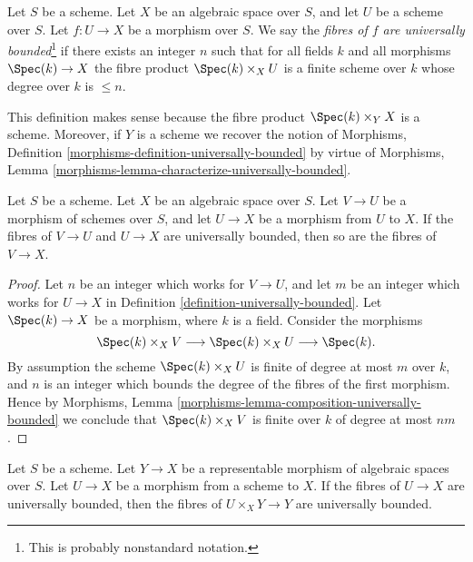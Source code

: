 \begin{definition}
\label{definition-universally-bounded}
Let $S$ be a scheme. Let $X$ be an algebraic space over $S$, and
let $U$ be a scheme over $S$. Let $f : U \to X$ be a morphism over $S$.
We say the {\it fibres of $f$ are universally bounded}\footnote{This is
probably nonstandard notation.}
if there exists an integer $n$ such that for all fields
$k$ and all morphisms $\Spec(k) \to X$ the fibre
product $\Spec(k) \times_X U$ is a finite scheme over $k$
whose degree over $k$ is $\leq n$.
\end{definition}

\noindent
This definition makes sense because the fibre product
$\Spec(k) \times_Y X$ is a scheme. Moreover, if $Y$ is a scheme
we recover the notion of
Morphisms, Definition \ref{morphisms-definition-universally-bounded}
by virtue of
Morphisms, Lemma \ref{morphisms-lemma-characterize-universally-bounded}.

\begin{lemma}
\label{lemma-composition-universally-bounded}
Let $S$ be a scheme. Let $X$ be an algebraic space over $S$.
Let $V \to U$ be a morphism of schemes over $S$, and let
$U \to X$ be a morphism from $U$ to $X$. If the fibres of
$V \to U$ and $U \to X$ are universally bounded, then so
are the fibres of $V \to X$.
\end{lemma}

\begin{proof}
Let $n$ be an integer which works for $V \to U$, and let $m$ be
an integer which works for $U \to X$ in
Definition \ref{definition-universally-bounded}.
Let $\Spec(k) \to X$ be a morphism, where $k$ is a field.
Consider the morphisms
$$
\Spec(k) \times_X V
\longrightarrow
\Spec(k) \times_X U
\longrightarrow
\Spec(k).
$$
By assumption the scheme $\Spec(k) \times_X U$
is finite of degree at most $m$ over $k$, and $n$ is an integer which
bounds the degree of the fibres of the first morphism. Hence by
Morphisms, Lemma \ref{morphisms-lemma-composition-universally-bounded}
we conclude that $\Spec(k) \times_X V$ is finite over $k$
of degree at most $nm$.
\end{proof}

\begin{lemma}
\label{lemma-base-change-universally-bounded}
Let $S$ be a scheme.
Let $Y \to X$ be a representable morphism of algebraic spaces over $S$.
Let $U \to X$ be a morphism from a scheme to $X$.
If the fibres of $U \to X$ are universally bounded, then the fibres
of $U \times_X Y \to Y$ are universally bounded.
\end{lemma}

